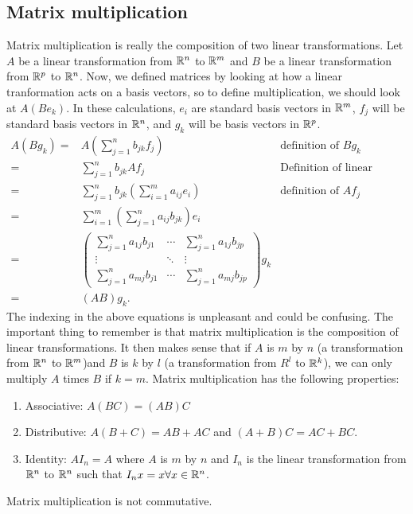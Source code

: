 \subsection{Matrix multiplication}
Matrix multiplication is really the composition of two linear
transformations. Let $A$ be a linear transformation from $\mathbb{R}^n$ to
$\mathbb{R}^m$ and $B$ be a linear transformation from $\mathbb{R}^p$ to $\mathbb{R}^n$. Now,
we defined matrices by looking at how a linear tranformation acts on a
basis vectors, so to define multiplication, we should look at $A(B
e_k)$. In these calculations, $e_i$ are standard basis vectors in
$\mathbb{R}^m$, $f_j$ will be standard basis vectors in $\mathbb{R}^n$, and $g_k$ will
be basis vectors in $\mathbb{R}^p$.
\begin{align*}
  A(B g_k) = & A (\sum_{j=1}^n b_{jk} f_j) & \text{definition of $Bg_k$}\\
  = & \sum_{j=1}^n b_{jk} A f_j & \text{Definition of linear
    transformtion} \\
  = & \sum_{j=1}^n b_{jk} \left(\sum_{i=1}^m a_{ij} e_i\right)  &
  \text{definition of $Af_j$} \\
  = & \sum_{i=1}^m \left(\sum_{j=1}^n a_{ij} b_{jk} \right) e_i \\
  = & \begin{pmatrix} 
    \sum_{j=1}^n a_{1j} b_{j1} & \cdots & \sum_{j=1}^n a_{1j} b_{jp} \\
    \vdots & \ddots & \vdots \\
    \sum_{j=1}^n a_{mj} b_{j1} & \cdots & \sum_{j=1}^n a_{mj} b_{jp}
  \end{pmatrix} g_k  \\
  = & (AB)g_k .
\end{align*}
The indexing in the above equations is unpleasant and could be
confusing. The important thing to remember is that matrix
multiplication is the composition of linear transformations. It then
makes sense that if $A$ is $m$ by $n$ (a transformation from $\mathbb{R}^n$ to
$\mathbb{R}^m$)and $B$ is $k$ by $l$ (a transformation from $R^l$ to $\mathbb{R}^k$),
we can only multiply $A$ times $B$ if $k = m$. Matrix multiplication
has the following properties:
\begin{enumerate}
\item Associative: $A(BC) = (AB) C$
\item Distributive: $A(B+C) = AB + AC$ and $(A+B)C = AC + BC$. 
\item Identity: $AI_n = A$ where $A$ is $m$ by $n$ and $I_n$ is the linear
  transformation from $\mathbb{R}^n$ to $\mathbb{R}^n$ such that $I_nx = x \forall x \in
  \mathbb{R}^n$.
\end{enumerate}
Matrix multiplication is not commutative. 


